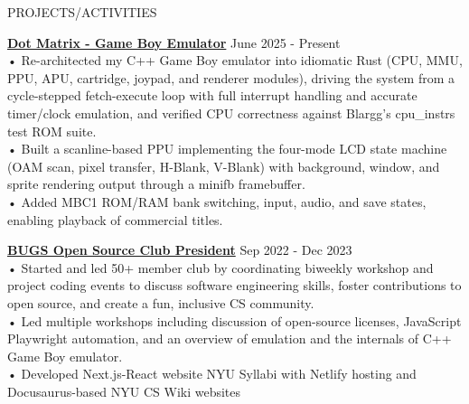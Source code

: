 \documentclass{resume} %
\begin{document}
\begin{rSection}{PROJECTS/ACTIVITIES}

\textbf{\href{https://github.com/aminoa/dot-matrix}{Dot Matrix - Game Boy Emulator}} \hfill June 2025 - Present \\
• Re-architected my C++ Game Boy emulator into idiomatic Rust (CPU, MMU, PPU, APU, cartridge, joypad, and renderer modules), driving the system from a cycle-stepped fetch-execute loop with full interrupt handling and accurate timer/clock emulation, and verified CPU correctness against Blargg's cpu\_instrs test ROM suite. \\
• Built a scanline-based PPU implementing the four-mode LCD state machine (OAM scan, pixel transfer, H-Blank, V-Blank) with background, window, and sprite rendering output through a minifb framebuffer. \\
• Added MBC1 ROM/RAM bank switching, input, audio, and save states, enabling playback of commercial titles.

\textbf{\href{https://bugs-nyu.github.io/}{BUGS Open Source Club President}} \hfill Sep 2022 - Dec 2023 \\
• Started and led 50+ member club by coordinating biweekly workshop and project coding events to discuss software engineering skills, foster contributions to open source, and create a fun, inclusive CS community.\\
• Led multiple workshops including discussion of open-source licenses, JavaScript Playwright automation, and an overview of emulation and the internals of C++ Game Boy emulator.\\
• Developed Next.js-React website NYU Syllabi with Netlify hosting and Docusaurus-based NYU CS Wiki websites

\end{rSection}


\end{document}
